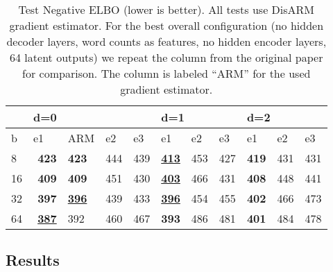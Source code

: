 \begin{table}[]
\caption{Test Negative ELBO (lower is better). All tests use DisARM gradient estimator. For the best overall configuration (no hidden decoder layers, word counts as features, no hidden encoder layers, 64 latent outputs) we repeat the column from the original paper for comparison. The column is labeled ``ARM'' for the used gradient estimator.}
\label{tab:test}
\centering
\begin{tabular}{lrlrrrrrrrr}
\hline
   & \multicolumn{1}{l}{d=0} &              & \multicolumn{1}{l}{}   & \multicolumn{1}{l}{}  & \multicolumn{3}{l}{d=1}                                                  & \multicolumn{3}{l}{d=2}                                                  \\ \hline
b  & \multicolumn{1}{l}{e1}  & ARM      & \multicolumn{1}{l}{e2} & \multicolumn{1}{l}{e3} & \multicolumn{1}{l}{e1} & \multicolumn{1}{l}{e2} & \multicolumn{1}{l}{e3} & \multicolumn{1}{l}{e1} & \multicolumn{1}{l}{e2} & \multicolumn{1}{l}{e3} \\ \hline 
8  & \textbf{423}            & \textbf{423} & 444                    & 439                    & {\ul \textbf{413}}     & 453                    & 427                    & \textbf{419}           & 431                    & 431                    \\
16 & \textbf{409}            & \textbf{409} & 451                    & 430                    & {\ul \textbf{403}}     & 466                    & 431                    & \textbf{408}           & 448                    & 441                    \\
32 & {\textbf{397}}      & {\ul \textbf{396}}          & 439                    & 433                    & {\ul \textbf{396}}           & 454                    & 455                    & \textbf{402}           & 466                    & 473                    \\
64 & {\ul \textbf{387}}      & 392          & 460                    & 467                    & \textbf{393}           & 486                    & 481                    & \textbf{401}           & 484                    & 478                    \\ \hline 
\end{tabular}
\end{table}


\subsection{Results}
\label{sec:results}

